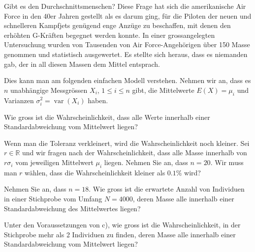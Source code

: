 Gibt es den Durchschnittsmenschen? 
Diese Frage hat sich die amerikanische Air Force in den 40er Jahren gestellt
als es darum ging, für die Piloten der neuen und schnelleren Kampfjets
genügend enge Anzüge zu beschaffen, mit denen den erhöhten G-Kräften
begegnet werden konnte.
In einer grossangelegten Untersuchung wurden von Tausenden von
Air Force-Angehörigen über 150 Masse genommen und statistisch ausgewertet.
Es stellte sich heraus, dass es niemanden gab, der in all diesen Massen
dem Mittel entsprach.

Dies kann man am folgenden einfachen Modell verstehen.
Nehmen wir an, dass es $n$ unabhängige Messgrössen $X_i$, $1\le i\le n$  gibt,
die Mittelwerte $E(X) = \mu_i$ und Varianzen
$\sigma_i^2 = \operatorname{var}(X_i)$ haben.

\begin{teilaufgaben}
\item
Wie gross ist die Wahrscheinlichkeit, dass alle Werte innerhalb einer
Standardabweichung vom Mittelwert liegen?
\item
Wenn man die Toleranz verkleinert, wird die Wahrscheinlichkeit noch kleiner.
Sei $r\in\mathbb R$ und wir fragen nach der Wahrscheinlichkeit, dass alle
Masse innerhalb von $r\sigma_i$ vom jeweiligen Mittelwert $\mu_i$ liegen.
Nehmen Sie an, dass $n=20$.
Wir muss man $r$ wählen, dass die Wahrscheinlichkeit kleiner als $0.1\%$
wird?
\item
Nehmen Sie an, dass $n=18$.
Wie gross ist die erwartete Anzahl von Individuen in einer Stichprobe
vom Umfang $N=4000$, deren Masse alle innerhalb einer Standardabweichung
des Mittelwertes liegen?
\item
Unter den Voraussetzungen von c), wie gross ist die Wahrscheinlichkeit,
in der Stichprobe mehr als 2 Individuen zu finden, deren Masse alle
innerhalb einer Standardabweichung vom Mittelwert liegen?
\end{teilaufgaben}

